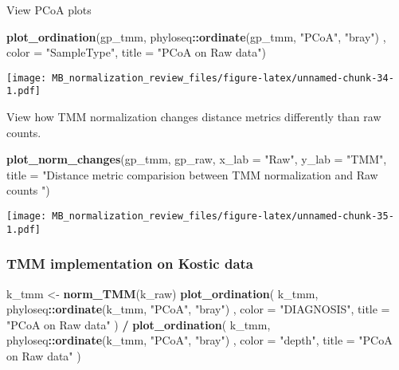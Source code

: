 \documentclass[
]{book}
\newenvironment{Shaded}{\begin{snugshade}}{\end{snugshade}}
\newcommand{\DataTypeTok}[1]{\textcolor[rgb]{0.13,0.29,0.53}{#1}}
\newcommand{\KeywordTok}[1]{\textcolor[rgb]{0.13,0.29,0.53}{\textbf{#1}}}
\newcommand{\NormalTok}[1]{#1}
\newcommand{\OperatorTok}[1]{\textcolor[rgb]{0.81,0.36,0.00}{\textbf{#1}}}
\newcommand{\StringTok}[1]{\textcolor[rgb]{0.31,0.60,0.02}{#1}}
\begin{document}
View PCoA plots

\begin{Shaded}
\begin{Highlighting}[]
\KeywordTok{plot\_ordination}\NormalTok{(gp\_tmm, phyloseq}\OperatorTok{::}\KeywordTok{ordinate}\NormalTok{(gp\_tmm, }\StringTok{"PCoA"}\NormalTok{, }\StringTok{"bray"}\NormalTok{) , }\DataTypeTok{color =} \StringTok{"SampleType"}\NormalTok{, }\DataTypeTok{title =} \StringTok{"PCoA on Raw data"}\NormalTok{)}
\end{Highlighting}
\end{Shaded}

\texttt{[image: MB\_normalization\_review\_files/figure-latex/unnamed-chunk-34-1.pdf]}

View how TMM normalization changes distance metrics differently than raw counts.

\begin{Shaded}
\begin{Highlighting}[]
\KeywordTok{plot\_norm\_changes}\NormalTok{(gp\_tmm, gp\_raw,}
                  \DataTypeTok{x\_lab =} \StringTok{"Raw"}\NormalTok{, }\DataTypeTok{y\_lab =} \StringTok{"TMM"}\NormalTok{,}
                  \DataTypeTok{title =} \StringTok{"Distance metric comparision between TMM normalization and Raw counts "}\NormalTok{)}
\end{Highlighting}
\end{Shaded}

\texttt{[image: MB\_normalization\_review\_files/figure-latex/unnamed-chunk-35-1.pdf]}

\hypertarget{tmm-implementation-on-kostic-data}{%
\subsubsection{TMM implementation on Kostic data}\label{tmm-implementation-on-kostic-data}}

\begin{Shaded}
\begin{Highlighting}[]
\NormalTok{k\_tmm \textless{}{-}}\StringTok{ }\KeywordTok{norm\_TMM}\NormalTok{(k\_raw)}
\KeywordTok{plot\_ordination}\NormalTok{(}
\NormalTok{    k\_tmm,}
\NormalTok{    phyloseq}\OperatorTok{::}\KeywordTok{ordinate}\NormalTok{(k\_tmm, }\StringTok{"PCoA"}\NormalTok{, }\StringTok{"bray"}\NormalTok{) ,}
    \DataTypeTok{color =} \StringTok{"DIAGNOSIS"}\NormalTok{,}
    \DataTypeTok{title =} \StringTok{"PCoA on Raw data"}
\NormalTok{) }\OperatorTok{/}
\StringTok{    }\KeywordTok{plot\_ordination}\NormalTok{(}
\NormalTok{        k\_tmm,}
\NormalTok{        phyloseq}\OperatorTok{::}\KeywordTok{ordinate}\NormalTok{(k\_tmm, }\StringTok{"PCoA"}\NormalTok{, }\StringTok{"bray"}\NormalTok{) ,}
        \DataTypeTok{color =} \StringTok{"depth"}\NormalTok{,}
        \DataTypeTok{title =} \StringTok{"PCoA on Raw data"}
\NormalTok{    )}
\end{Highlighting}
\end{Shaded}
\end{document}
